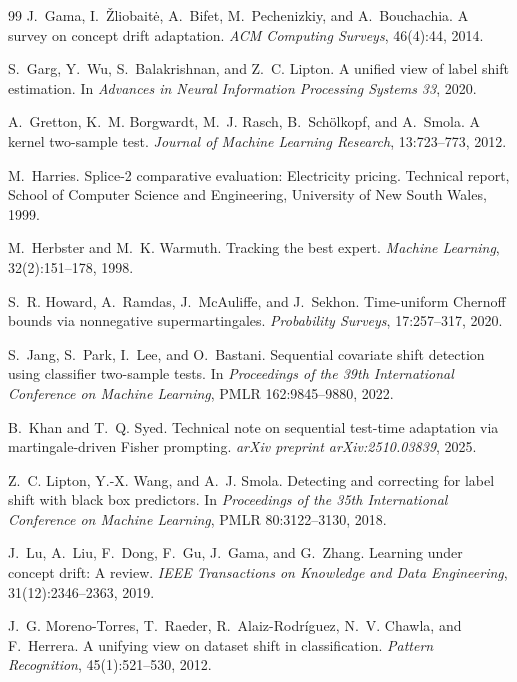 \begin{thebibliography}{99}
J.~Gama, I.~\v{Z}liobait\.{e}, A.~Bifet, M.~Pechenizkiy, and A.~Bouchachia.
A survey on concept drift adaptation.
\textit{ACM Computing Surveys}, 46(4):44, 2014.

S.~Garg, Y.~Wu, S.~Balakrishnan, and Z.~C. Lipton.
A unified view of label shift estimation.
In \textit{Advances in Neural Information Processing Systems 33}, 2020.

A.~Gretton, K.~M. Borgwardt, M.~J. Rasch, B.~Sch\"olkopf, and A.~Smola.
A kernel two-sample test.
\textit{Journal of Machine Learning Research}, 13:723--773, 2012.

M.~Harries.
Splice-2 comparative evaluation: Electricity pricing.
Technical report, School of Computer Science and Engineering, University of New South Wales, 1999.

M.~Herbster and M.~K. Warmuth.
Tracking the best expert.
\textit{Machine Learning}, 32(2):151--178, 1998.

S.~R. Howard, A.~Ramdas, J.~McAuliffe, and J.~Sekhon.
Time-uniform Chernoff bounds via nonnegative supermartingales.
\textit{Probability Surveys}, 17:257--317, 2020.

S.~Jang, S.~Park, I.~Lee, and O.~Bastani.
Sequential covariate shift detection using classifier two-sample tests.
In \textit{Proceedings of the 39th International Conference on Machine Learning}, PMLR 162:9845--9880, 2022.

B.~Khan and T.~Q. Syed.
Technical note on sequential test-time adaptation via martingale-driven Fisher prompting.
\textit{arXiv preprint arXiv:2510.03839}, 2025.

Z.~C. Lipton, Y.-X. Wang, and A.~J. Smola.
Detecting and correcting for label shift with black box predictors.
In \textit{Proceedings of the 35th International Conference on Machine Learning}, PMLR 80:3122--3130, 2018.

J.~Lu, A.~Liu, F.~Dong, F.~Gu, J.~Gama, and G.~Zhang.
Learning under concept drift: A review.
\textit{IEEE Transactions on Knowledge and Data Engineering}, 31(12):2346--2363, 2019.

J.~G. Moreno-Torres, T.~Raeder, R.~Alaiz-Rodr\'iguez, N.~V. Chawla, and F.~Herrera.
A unifying view on dataset shift in classification.
\textit{Pattern Recognition}, 45(1):521--530, 2012.


\end{thebibliography}
